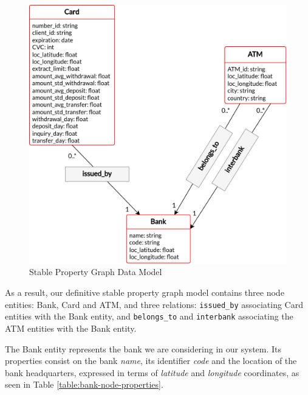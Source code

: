 \begin{figure}[h]
  \centering
  \includegraphics[scale = 0.7]{images/1-DataModel/PG-stable-behavior-cards.png}
  \caption{Stable Property Graph Data Model}
  \label{img:pg-stable-def}
\end{figure}

As a result, our definitive stable property graph model contains three node entities: Bank, Card and ATM, and three relations: \texttt{issued\_by} associating Card entities with the Bank entity, and \texttt{belongs\_to} and \texttt{interbank} associating the ATM entities with the Bank entity. 

The Bank entity represents the bank we are considering in our system. Its properties consist
on the bank \emph{name}, its identifier \emph{code} and the location
of the bank headquarters, expressed in terms of \emph{latitude} and \emph{longitude}
coordinates, as seen in Table \ref{table:bank-node-properties}.
  



